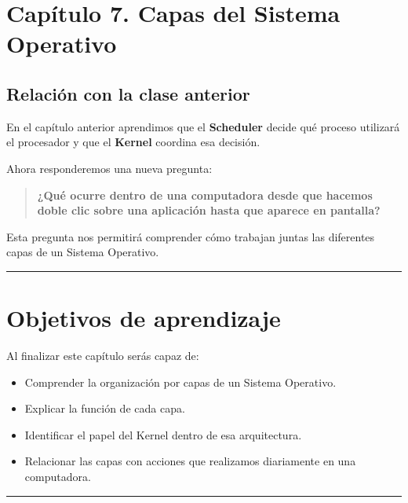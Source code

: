 \documentclass[
  spanish,
  letterpaper,
]{scrbook}
\providecommand{\tightlist}{%
  \setlength{\itemsep}{0pt}\setlength{\parskip}{0pt}}
\begin{document}

\chapter{Capítulo 7. Capas del Sistema
Operativo}\label{capuxedtulo-7.-capas-del-sistema-operativo}

\section{Relación con la clase
anterior}\label{relaciuxf3n-con-la-clase-anterior-1}

En el capítulo anterior aprendimos que el \textbf{Scheduler} decide qué
proceso utilizará el procesador y que el \textbf{Kernel} coordina esa
decisión.

Ahora responderemos una nueva pregunta:

\begin{quote}
\textbf{¿Qué ocurre dentro de una computadora desde que hacemos doble
clic sobre una aplicación hasta que aparece en pantalla?}
\end{quote}

Esta pregunta nos permitirá comprender cómo trabajan juntas las
diferentes capas de un Sistema Operativo.

\begin{center}\rule{0.5\linewidth}{0.5pt}\end{center}


\chapter{Objetivos de aprendizaje}\label{objetivos-de-aprendizaje-5}

Al finalizar este capítulo serás capaz de:

\begin{itemize}
\tightlist
\item
  Comprender la organización por capas de un Sistema Operativo.
\item
  Explicar la función de cada capa.
\item
  Identificar el papel del Kernel dentro de esa arquitectura.
\item
  Relacionar las capas con acciones que realizamos diariamente en una
  computadora.
\end{itemize}

\begin{center}\rule{0.5\linewidth}{0.5pt}\end{center}
\end{document}
